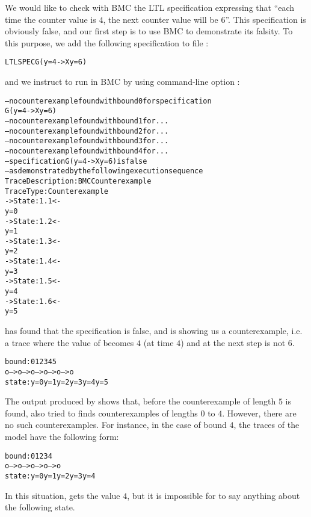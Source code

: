 We would like to check with BMC the LTL specification  
expressing that ``each time the counter value is $4$, the next counter
value will be $6$''. This specification is obviously false, and our first
step is to use \nusmv BMC to demonstrate its falsity.
To this purpose, we add the following specification to file :
\begin{alltt}
LTLSPEC G ( y=4 -> X y=6 )
\end{alltt}
and we instruct \nusmv to run in BMC by using command-line option :
\begin{alltt}
\shellprompt {}
-- no counterexample found with bound 0 for specification 
   G(y = 4 -> X y = 6)
-- no counterexample found with bound 1 for ... 
-- no counterexample found with bound 2 for ...
-- no counterexample found with bound 3 for ...
-- no counterexample found with bound 4 for ...
-- specification  G (y = 4 ->  X y = 6)   is false
-- as demonstrated by the following execution sequence
Trace Description: BMC Counterexample
Trace Type: Counterexample
-> State: 1.1 <-
  y = 0
-> State: 1.2 <-
  y = 1
-> State: 1.3 <-
  y = 2
-> State: 1.4 <-
  y = 3
-> State: 1.5 <-
  y = 4
-> State: 1.6 <-
  y = 5
\shellprompt
\end{alltt}
\nusmv has found that the specification is false, and is showing us a
counterexample, i.e. a trace where the value of  becomes $4$ (at time
$4$) and at the next step is not $6$.
\begin{alltt}
 bound:   0    1    2    3    4    5
          o--->o--->o--->o--->o--->o
 state:  y=0  y=1  y=2  y=3  y=4  y=5 
\end{alltt}

The output produced by \nusmv shows that, before the counterexample
of length $5$ is found, \nusmv also tried to finds counterexamples of
lengths $0$ to $4$. However, there are no such
counterexamples. For instance, in the case of bound $4$, the traces of the
model have the following form:
\begin{alltt}
 bound:   0    1    2    3    4   
          o--->o--->o--->o--->o
 state:  y=0  y=1  y=2  y=3  y=4  
\end{alltt}
In this situation,  gets the value $4$, but it is impossible for
\nusmv to say anything about the following state.

